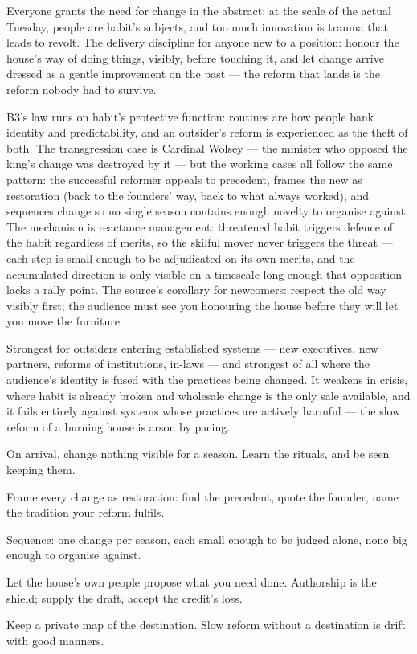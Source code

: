 \begin{core}
Everyone grants the need for change in the abstract; at the scale of the actual Tuesday, people are habit's subjects, and too much innovation is trauma that leads to revolt. The delivery discipline for anyone new to a position: honour the house's way of doing things, visibly, before touching it, and let change arrive dressed as a gentle improvement on the past --- the reform that lands is the reform nobody had to survive.
\end{core}
\begin{mechanism}
B3's law runs on habit's protective function: routines are how people bank identity and predictability, and an outsider's reform is experienced as the theft of both. The transgression case is Cardinal Wolsey --- the minister who opposed the king's change was destroyed by it --- but the working cases all follow the same pattern: the successful reformer appeals to precedent, frames the new as restoration (back to the founders' way, back to what always worked), and sequences change so no single season contains enough novelty to organise against. The mechanism is reactance management: threatened habit triggers defence of the habit regardless of merits, so the skilful mover never triggers the threat --- each step is small enough to be adjudicated on its own merits, and the accumulated direction is only visible on a timescale long enough that opposition lacks a rally point. The source's corollary for newcomers: respect the old way visibly first; the audience must see you honouring the house before they will let you move the furniture.
\end{mechanism}
\begin{conditions}
Strongest for outsiders entering established systems --- new executives, new partners, reforms of institutions, in-laws --- and strongest of all where the audience's identity is fused with the practices being changed. It weakens in crisis, where habit is already broken and wholesale change is the only sale available, and it fails entirely against systems whose practices are actively harmful --- the slow reform of a burning house is arson by pacing.
\end{conditions}
\begin{application}
  \item On arrival, change nothing visible for a season. Learn the rituals, and be seen keeping them.
  \item Frame every change as restoration: find the precedent, quote the founder, name the tradition your reform fulfils.
  \item Sequence: one change per season, each small enough to be judged alone, none big enough to organise against.
  \item Let the house's own people propose what you need done. Authorship is the shield; supply the draft, accept the credit's loss.
  \item Keep a private map of the destination. Slow reform without a destination is drift with good manners.
\end{application}
